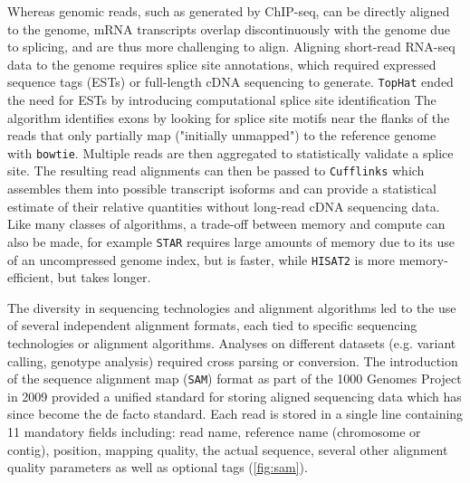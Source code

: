 Whereas genomic reads, such as generated by ChIP-seq, can be directly aligned to the genome, mRNA transcripts overlap discontinuously with the genome due to splicing, and are thus more challenging to align. Aligning short-read RNA-seq data to the genome requires splice site annotations, which required expressed sequence tags (ESTs) or full-length cDNA sequencing to generate. \verb|TopHat| ended the need for ESTs by introducing computational splice site identification The algorithm identifies exons by looking for splice site motifs near the flanks of the reads that only partially map ("initially unmapped") to the reference genome with \verb|bowtie|. Multiple reads are then aggregated to statistically validate a splice site. The resulting read alignments can then be passed to \verb|Cufflinks| which assembles them into possible transcript isoforms and can provide a statistical estimate of their relative quantities without long-read cDNA sequencing data. Like many classes of algorithms, a trade-off between memory and compute can also be made, for example \verb|STAR| requires large amounts of memory due to its use of an uncompressed genome index, but is faster, while \verb|HISAT2| is more memory-efficient, but takes longer.




The diversity in sequencing technologies and alignment algorithms led to the use of several independent alignment formats, each tied to specific sequencing technologies or alignment algorithms. Analyses on different datasets (e.g. variant calling, genotype analysis) required cross parsing or conversion. The introduction of the sequence alignment map (\verb|SAM|) format as part of the 1000 Genomes Project in 2009 provided a unified standard for storing aligned sequencing data which has since become the de facto standard. Each read is stored in a single line containing 11 mandatory fields including: read name, reference name (chromosome or contig), position, mapping quality, the actual sequence, several other alignment quality parameters as well as optional tags (\autoref{fig:sam}).

